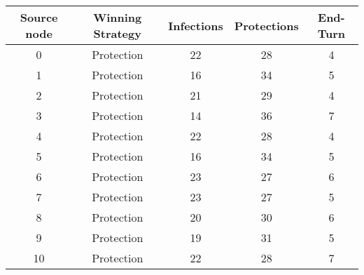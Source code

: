 \documentclass[results.tex]{subfiles}
\begin{document}
    \begin{center}
        \begin{tabular}{| c || c | c | c | c |}
            \hline
            {\bfseries Source node} & {\bfseries Winning Strategy} & {\bfseries Infections} & {\bfseries Protections}
            & {\bfseries End-Turn}
            \\  %
            \hline\hline
            0                       & Protection                   & 22                     & 28                      & 4                    \\
            \hline
            1                       & Protection                   & 16                     & 34                      & 5                    \\
            \hline
            2                       & Protection                   & 21                     & 29                      & 4                    \\
            \hline
            3                       & Protection                   & 14                     & 36                      & 7                    \\
            \hline
            4                       & Protection                   & 22                     & 28                      & 4                    \\
            \hline
            5                       & Protection                   & 16                     & 34                      & 5                    \\
            \hline
            6                       & Protection                   & 23                     & 27                      & 6                    \\
            \hline
            7                       & Protection                   & 23                     & 27                      & 5                    \\
            \hline
            8                       & Protection                   & 20                     & 30                      & 6                    \\
            \hline
            9                       & Protection                   & 19                     & 31                      & 5                    \\
            \hline
            10                      & Protection                   & 22                     & 28                      & 7                    \\

\end{tabular}
\end{center}
\end{document}
